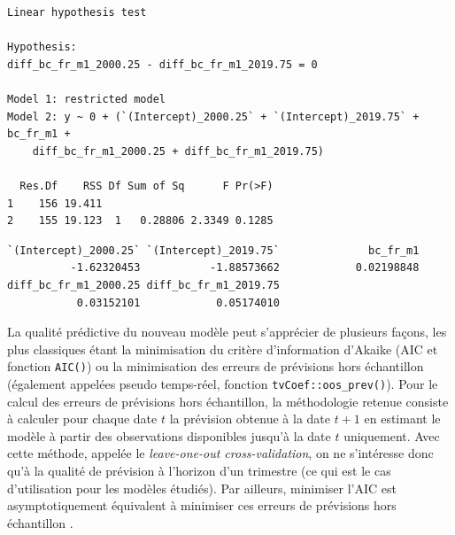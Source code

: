 \documentclass[
  a4paper,
  DIV=11,
  numbers=noendperiod,
  french]{scrartcl}
\newenvironment{Shaded}{\begin{snugshade}}{\end{snugshade}}
\newcommand{\AttributeTok}[1]{\textcolor[rgb]{0.40,0.45,0.13}{#1}}
\newcommand{\DecValTok}[1]{\textcolor[rgb]{0.68,0.00,0.00}{#1}}
\newcommand{\FunctionTok}[1]{\textcolor[rgb]{0.28,0.35,0.67}{#1}}
\newcommand{\NormalTok}[1]{\textcolor[rgb]{0.00,0.23,0.31}{#1}}
\newcommand{\OtherTok}[1]{\textcolor[rgb]{0.00,0.23,0.31}{#1}}
\newcommand{\SpecialCharTok}[1]{\textcolor[rgb]{0.37,0.37,0.37}{#1}}
\newcommand{\StringTok}[1]{\textcolor[rgb]{0.13,0.47,0.30}{#1}}
\newcommand\1{{\mathds 1}}
\theoremstyle{remark}
\begin{document}
\begin{Shaded}
\end{Shaded}

\begin{verbatim}
Linear hypothesis test

Hypothesis:
diff_bc_fr_m1_2000.25 - diff_bc_fr_m1_2019.75 = 0

Model 1: restricted model
Model 2: y ~ 0 + (`(Intercept)_2000.25` + `(Intercept)_2019.75` + bc_fr_m1 + 
    diff_bc_fr_m1_2000.25 + diff_bc_fr_m1_2019.75)

  Res.Df    RSS Df Sum of Sq      F Pr(>F)
1    156 19.411                           
2    155 19.123  1   0.28806 2.3349 0.1285
\end{verbatim}

\begin{Shaded}
\end{Shaded}

\begin{verbatim}
`(Intercept)_2000.25` `(Intercept)_2019.75`              bc_fr_m1 
          -1.62320453           -1.88573662            0.02198848 
diff_bc_fr_m1_2000.25 diff_bc_fr_m1_2019.75 
           0.03152101            0.05174010 
\end{verbatim}

La qualité prédictive du nouveau modèle peut s'apprécier de plusieurs
façons, les plus classiques étant la minimisation du critère
d'information d'Akaike (AIC et fonction \texttt{AIC()}) ou la
minimisation des erreurs de prévisions hors échantillon (également
appelées pseudo temps-réel, fonction \texttt{tvCoef::oos\_prev()}). Pour
le calcul des erreurs de prévisions hors échantillon, la méthodologie
retenue consiste à calculer pour chaque date \(t\) la prévision obtenue
à la date \(t+1\) en estimant le modèle à partir des observations
disponibles jusqu'à la date \(t\) uniquement. Avec cette méthode,
appelée le \emph{leave-one-out cross-validation}, on ne s'intéresse donc
qu'à la qualité de prévision à l'horizon d'un trimestre (ce qui est le
cas d'utilisation pour les modèles étudiés). Par ailleurs, minimiser
l'AIC est asymptotiquement équivalent à minimiser ces erreurs de
prévisions hors échantillon \autocite{AIC}.
\end{document}

